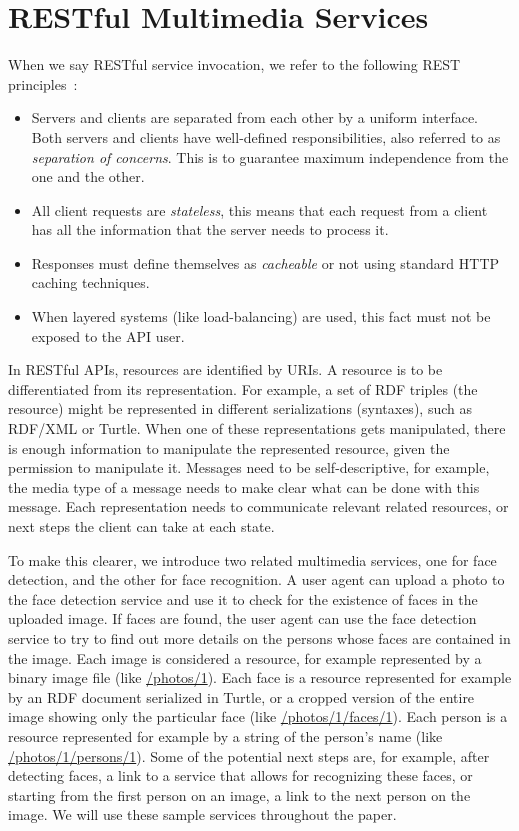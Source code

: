 \documentclass[runningheads,a4paper, twocolumn]{llncs}
\begin{document}
\section{RESTful Multimedia Services} \label{sec:restful-multimedia-services}
\label{RESTfulServices}
When we say RESTful service invocation, we refer to the following REST principles~\cite{FieldingREST}:
\begin{itemize}
\item Servers and clients are separated from each other by a uniform interface. Both servers and clients have well-defined responsibilities, also referred to as \emph{separation of concerns}. This is to guarantee maximum independence from the one and the other.
\item All client requests are \emph{stateless}, this means that each request from a client has all the information that the server needs to process it.
\item Responses must define themselves as \emph{cacheable} or not using standard HTTP caching techniques.
\item When layered systems (like load-balancing) are used, this fact must not be exposed to the API user.
\end{itemize}

In RESTful APIs, resources are identified by URIs. A resource is to be differentiated from its representation. For example, a set of RDF triples (the resource) might be represented in different serializations (syntaxes), such as RDF/XML or Turtle. When one of these representations gets manipulated, there is enough information to manipulate the represented resource, given the permission to manipulate it. Messages need to be self-descriptive, for example, the media type of a message needs to make clear what can be done with this message. Each representation needs to communicate relevant related resources, or next steps the client can take at each state.

To make this clearer, we introduce two related multimedia services, one for face detection, and the other for face recognition. A user agent can upload a photo to the face detection service and use it to check for the existence of faces in the uploaded image. If faces are found, the user agent can use the face detection service to try to find out more details on the persons whose faces are contained in the image. Each image is considered a resource, for example represented by a binary image file (like \url{/photos/1}). Each face is a resource represented for example by an RDF document serialized in Turtle, or a cropped version of the entire image showing only the particular face (like \url{/photos/1/faces/1}). Each person is a resource represented for example by a string of the person's name (like \url{/photos/1/persons/1}). Some of the potential next steps are, for example, after detecting faces, a link to a service that allows for recognizing these faces, or starting from the first person on an image, a link to the next person on the image. We will use these sample services throughout the paper.
\end{document}
